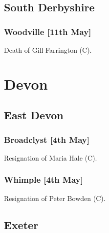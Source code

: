 \documentclass[a4paper,openany]{book}
\begin{document}
\begin{resultsiii}
\subsection*{South Derbyshire}

\subsubsection*{Woodville \hspace*{\fill}\nolinebreak[1]%
\enspace\hspace*{\fill}
[11th May]}


Death of Gill Farrington (C).

\section{Devon}

\subsection*{East Devon}

\subsubsection*{Broadclyst \hspace*{\fill}\nolinebreak[1]%
\enspace\hspace*{\fill}
[4th May]}


Resignation of Maria Hale (C).

\subsubsection*{Whimple \hspace*{\fill}\nolinebreak[1]%
\enspace\hspace*{\fill}
[4th May]}


Resignation of Peter Bowden (C).

\subsection*{Exeter}


\end{resultsiii}
\end{document}
